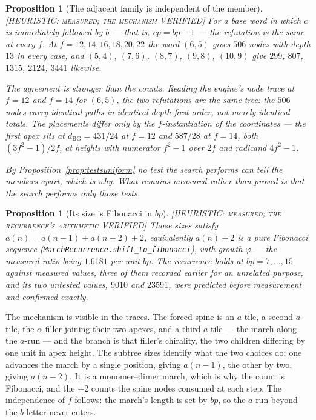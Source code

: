 \documentclass[11pt,reqno]{amsart}
\theoremstyle{plain}
\newtheorem{proposition}[theorem]{Proposition}
\theoremstyle{definition}
\newcommand{\lab}[1]{\hfill\textnormal{\footnotesize\textsc{[#1]}}}
\begin{document}
\begin{proposition}[The adjacent family is independent of the member]\label{prop:findep}\lab{HEURISTIC: measured; the mechanism VERIFIED}
For a base word in which $c$ is immediately followed by $b$ --- that is, $cp=bp-1$ --- the
refutation is the same at every $f$. At $f=12,14,16,18,20,22$ the word $(6,5)$ gives $506$ nodes with
depth $13$ in every case, and $(5,4)$, $(7,6)$, $(8,7)$, $(9,8)$, $(10,9)$ give $299$, $807$, $1315$,
$2124$, $3441$ likewise.

The agreement is stronger than the counts. Reading the engine's node trace at $f=12$ and $f=14$ for
$(6,5)$, the two refutations are the \emph{same tree}: the $506$ nodes carry identical paths in
identical depth-first order, not merely identical totals. The placements differ only by the
$f$-instantiation of the coordinates --- the first apex sits at $d_{\mathrm{BG}}=431/24$ at $f=12$
and $587/28$ at $f=14$, both $(3f^2-1)/2f$, at heights with numerator $f^2-1$ over $2f$ and radicand
$4f^2-1$.

By Proposition~\ref{prop:testsuniform} no test the search performs can tell the members apart, which
is why. What remains measured rather than proved is that the search performs only those tests.
\end{proposition}

\begin{proposition}[Its size is Fibonacci in $bp$]\label{prop:fib}\lab{HEURISTIC: measured; the recurrence's arithmetic VERIFIED}
Those sizes satisfy $a(n)=a(n-1)+a(n-2)+2$, equivalently $a(n)+2$ is a pure Fibonacci sequence
(\texttt{MarchRecurrence.shift\_to\_fibonacci}), with growth $\varphi$ --- the measured ratio being
$1.6181$ per unit $bp$. The recurrence holds at $bp=7,\dots,15$ against measured values, three of
them recorded earlier for an unrelated purpose, and its two untested values, $9010$ and $23591$,
were predicted before measurement and confirmed exactly.
\end{proposition}

The mechanism is visible in the traces. The forced spine is an $a$-tile, a second $a$-tile, the
$\alpha$-filler joining their two apexes, and a third $a$-tile --- the march along the $a$-run --- and
the branch is that filler's chirality, the two children differing by one unit in apex height. The
subtree sizes identify what the two choices do: one advances the march by a single position, giving
$a(n-1)$, the other by two, giving $a(n-2)$. It is a monomer--dimer march, which is why the count is
Fibonacci, and the $+2$ counts the spine nodes consumed at each step. The independence of $f$
follows: the march's length is set by $bp$, so the $a$-run beyond the $b$-letter never enters.
\end{document}
